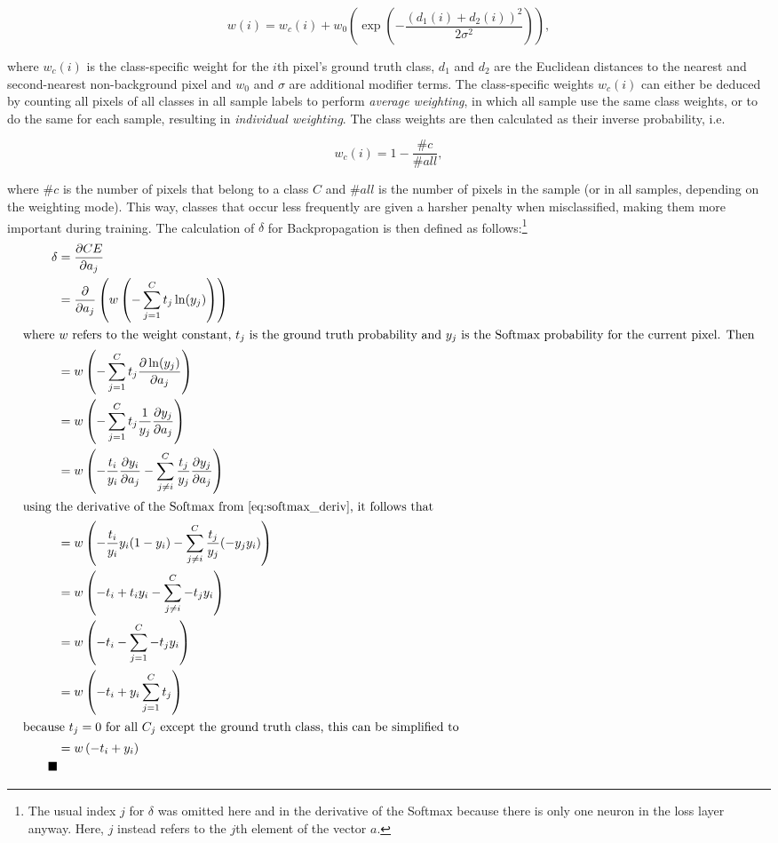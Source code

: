 \[ w(i) = w_c(i) + w_0 \left ( \exp \left (- \frac{(d_1(i) + d_2(i))^2}{2\sigma^2} \right ) \right ), \]

\noindent where $w_c(i)$ is the class-specific weight for the $i$th pixel's ground truth class, $d_1$ and $d_2$ are the Euclidean distances to the nearest and second-nearest non-background pixel and $w_0$ and $\sigma$ are additional modifier terms. The class-specific weights $w_c(i)$ can either be deduced by counting all pixels of all classes in all sample labels to perform \textit{average weighting}, in which all sample use the same class weights, or to do the same for each sample, resulting in \textit{individual weighting}. The class weights are then calculated as their inverse probability, i.e.

\[ w_c(i) = 1 - \frac{\#c}{\#all}, \]

\noindent where $\#c$ is the number of pixels that belong to a class $C$ and $\#all$ is the number of pixels in the sample (or in all samples, depending on the weighting mode). This way, classes that occur less frequently are given a harsher penalty when misclassified, making them more important during training. The calculation of $\delta$ for Backpropagation is then defined as follows:\footnote{The usual index $j$ for $\delta$ was omitted here and in the derivative of the Softmax because there is only one neuron in the loss layer anyway. Here, $j$ instead refers to the $j$th element of the vector $a$.} \\


\begin {align}
	\delta &= \frac{\partial CE}{\partial a_j} \\
		&= \frac{\partial}{\partial a_j} \left ( w \left ( - \sum \limits_{j=1}^{C} t_j \ln(y_j) \right ) \right ) \\ \intertext{where $w$ refers to the weight constant, $t_j$ is the ground truth probability and $y_j$ is the Softmax probability for the current pixel. Then}
		&= w \left ( - \sum \limits_{j=1}^{C} t_j \frac{\partial \ln(y_j)}{\partial a_j} \right ) \\
		&= w \left (- \sum \limits_{j=1}^{C} t_j \frac{1}{y_j} \frac{\partial y_j}{\partial a_j} \right ) \\
		&= w \left ( - \frac{t_i}{y_i} \frac{\partial y_i}{\partial a_j} - \sum \limits_{j \neq i}^{C} \frac{t_j}{y_j} \frac{\partial y_j}{\partial a_j} \right ) \\ \intertext{using the derivative of the Softmax from \ref{eq:softmax_deriv}, it follows that}
		&= w \left ( - \frac{t_i}{y_i} y_i (1 - y_i) - \sum \limits_{j \neq i}^{C} \frac{t_j}{y_j} (- y_j y_i) \right ) \\
		&= w \left ( - t_i + t_i y_i - \sum \limits_{j \neq i}^{C} - t_j y_i \right ) \\
		&= w \left ( - t_i - \sum \limits_{j=1}^{C} - t_j y_i  \right ) \\
		&= w \left ( - t_i + y_i \sum \limits_{j=1}^{C} t_j \right ) \\ \intertext{because $t_j = 0$ for all $C_j$ except the ground truth class, this can be simplified to} 
		&= w \left (- t_i + y_i \right ) \\ \tag*{$\blacksquare$} 
\end {align}

